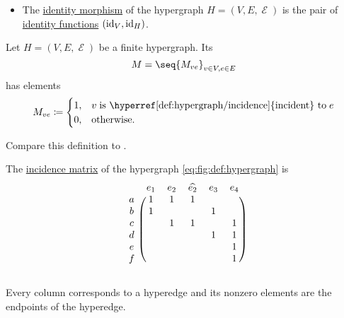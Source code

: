 \begin{definition}
\begin{itemize}
    \item The \hyperref[def:category/identity]{identity morphism} of the hypergraph \( H = (V, E, \mscrE) \) is the pair of \hyperref[def:multi_valued_function/identity]{identity functions} \( (\operatorname{id}_V, \operatorname{id}_H) \).
  \end{itemize}
\end{definition}

\begin{definition}\label{def:hypergraph_incidence_matrix}
  Let \( H = (V, E, \mscrE) \) be a finite hypergraph. Its 
  \begin{equation*}
    M = \seq{ M_{ve} }_{v \in V, e \in E}
  \end{equation*}
  has elements
  \begin{equation*}
    M_{ve} \coloneqq \begin{cases}
      1,  &v \T{is \hyperref[def:hypergraph/incidence]{incident} to} e \\
      0,  &\T{otherwise.}
    \end{cases}
  \end{equation*}

  Compare this definition to .
\end{definition}

\begin{example}\label{ex:def:hypergraph_incidence_matrix}
  The \hyperref[def:hypergraph_incidence_matrix]{incidence matrix} of the hypergraph \eqref{eq:fig:def:hypergraph} is
  \begin{equation}\label{eq:ex:def:hypergraph_incidence_matrix}
    \begin{blockarray}{cccccc}
        & e_1 & e_2 & \widehat{e_2} & e_3 & e_4 \\
      \begin{block}{c(ccccc)}
      a & 1   & 1   & 1             &     &     \\
      b & 1   &     &               & 1   &     \\
      c &     & 1   & 1             &     & 1   \\
      d &     &     &               & 1   & 1   \\
      e &     &     &               &     & 1   \\
      f &     &     &               &     & 1   \\
      \end{block}
    \end{blockarray}
  \end{equation}

  Every column corresponds to a hyperedge and its nonzero elements are the endpoints of the hyperedge.
\end{example}

